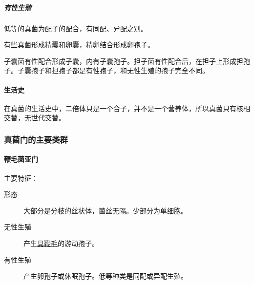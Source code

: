 \subparagraph{有性生殖}

低等的真菌为配子的配合，有同配、异配之别。

有些真菌形成精囊和卵囊，精卵结合形成卵孢子。

子囊菌有性配合形成子囊，内有子囊孢子。担子菌有性配合后，在担子上形成担孢子。子囊孢子和担孢子都是有性孢子，和无性生殖的孢子完全不同。

\paragraph{生活史}

在真菌的生活史中，二倍体只是一个合子，并不是一个营养体，所以真菌只有核相交替，无世代交替。

\subsubsection{真菌门的主要类群}

\paragraph{鞭毛菌亚门}

主要特征：

\begin{description}
	\item[形态] 大部分是分枝的丝状体，菌丝无隔。少部分为单细胞。
	\item[无性生殖] 产生\uline{具鞭毛}的游动孢子。
	\item[有性生殖] 产生卵孢子或休眠孢子。低等种类是同配或异配生殖。
\end{description}

